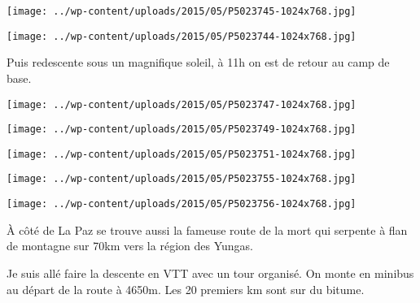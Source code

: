  

 

\begin{center} \texttt{[image: ../wp-content/uploads/2015/05/P5023745-1024x768.jpg]} \end{center}

 

 

\begin{center} \texttt{[image: ../wp-content/uploads/2015/05/P5023744-1024x768.jpg]} \end{center}

 

 Puis redescente sous un magnifique soleil, à 11h on est de retour au camp de base. 

 

\begin{center} \texttt{[image: ../wp-content/uploads/2015/05/P5023747-1024x768.jpg]} \end{center}

 

 

\begin{center} \texttt{[image: ../wp-content/uploads/2015/05/P5023749-1024x768.jpg]} \end{center}

 

 

\begin{center} \texttt{[image: ../wp-content/uploads/2015/05/P5023751-1024x768.jpg]} \end{center}

 

 

\begin{center} \texttt{[image: ../wp-content/uploads/2015/05/P5023755-1024x768.jpg]} \end{center}

 

 

\begin{center} \texttt{[image: ../wp-content/uploads/2015/05/P5023756-1024x768.jpg]} \end{center}

 

 À côté de La Paz se trouve aussi la fameuse route de la mort qui serpente à flan de montagne sur 70km vers la région des Yungas. 

 Je suis allé faire la descente en VTT avec un tour organisé. On monte en minibus au départ de la route à 4650m. Les 20 premiers km sont sur du bitume. 

